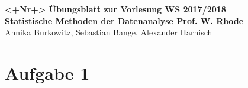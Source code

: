 \documentclass[a4paper, 11pt]{article}
\begin{document}
\noindent
\large{\textbf{<+Nr+> Übungsblatt zur Vorlesung \hfill WS 2017/2018 \\
Statistische Methoden der Datenanalyse \hfill Prof. W. Rhode}} \\
Annika Burkowitz, Sebastian Bange, Alexander Harnisch \\
\noindent\makebox[\linewidth]{\rule{\textwidth}{0.4pt}}

\section*{Aufgabe 1}
\end{document}
